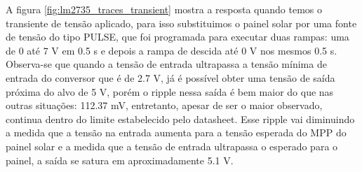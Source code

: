 \noindent
\begin{minipage}{\linewidth}
\label{fig:lm2735_transient}
\end{minipage}

\noindent
\begin{minipage}{\linewidth}
\label{fig:lm2735_traces_transient}
\end{minipage}

A figura \ref{fig:lm2735_traces_transient} mostra a resposta quando temos o transiente de tensão aplicado, para isso substituimos o painel solar por uma fonte de tensão do tipo PULSE, que foi programada para executar duas rampas: uma de 0 até 7 V em 0.5 s e depois a rampa de descida até 0 V nos mesmos 0.5 s. Observa-se que quando a tensão de entrada ultrapassa a tensão mínima de entrada do conversor que é de 2.7 V, já é possível obter uma tensão de saída próxima do alvo de 5 V, porém o ripple nessa saída é bem maior do que nas outras situações: 112.37 mV, entretanto, apesar de ser o maior observado, continua dentro do limite estabelecido pelo datasheet. Esse ripple vai diminuindo a medida que a tensão na entrada aumenta para a tensão esperada do MPP do painel solar e a medida que a tensão de entrada ultrapassa o esperado para o painel, a saída se satura em aproximadamente 5.1 V.

